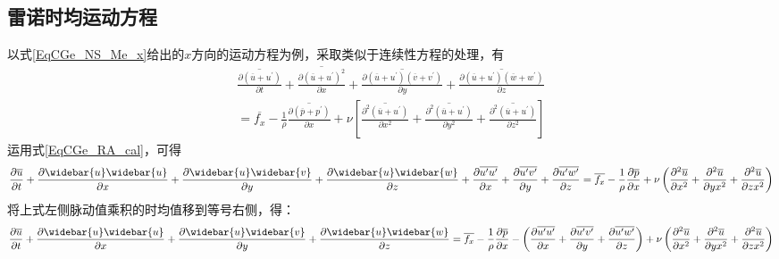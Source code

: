 \subsection{雷诺时均运动方程}
以式\eqref{EqCGe_NS_Me_x}给出的$x$方向的运动方程为例，采取类似于连续性方程的处理，有
\begin{equation*}
  \begin{aligned}
    \overline{
      \frac{\partial (\overline{u}+u^{\prime})}{\partial t}
    }
    +
    \overline{
      \frac{\partial (\overline{u}+u^{\prime})^{2}}{\partial x}
    }
    +
    \overline{
      \frac{\partial (\overline{u}+u^{\prime})(\overline{v}+v^{\prime})}{\partial y}
    }
    +
    \overline{
      \frac{\partial (\overline{u}+u^{\prime})(\overline{w}+w^{\prime})}{\partial z}
    }
    \\
    =
    \overline{f_{x}}
    -\frac{1}{\rho}
    \overline{
      \frac{\partial (\overline{p}+p^{\prime})}{\partial x}
    }
    +
    \nu
    \left[
      \overline{
        \frac{\partial^{2} (\overline{u}+u^{\prime})}{\partial x^{2}}
      }
      +
      \overline{
        \frac{\partial^{2} (\overline{u}+u^{\prime})}{\partial y^{2}}
      }
      +
      \overline{
        \frac{\partial^{2} (\overline{u}+u^{\prime})}{\partial z^{2}}
      }
    \right]
  \end{aligned}
\end{equation*}
运用式\eqref{EqCGe_RA_cal}，可得
\begin{equation*}
  \frac{\partial \overline{u}}{\partial t} +
  \frac{\partial \widebar{u}\widebar{u}}{\partial x} +
  \frac{\partial \widebar{u}\widebar{v}}{\partial y} +
  \frac{\partial \widebar{u}\widebar{w}}{\partial z} +
  \frac{\partial \overline{u^{\prime}u^{\prime}}}{\partial x} +
  \frac{\partial \overline{u^{\prime}v^{\prime}}}{\partial y} +
  \frac{\partial \overline{u^{\prime}w^{\prime}}}{\partial z}
  =
  \overline{f_{x}}
  -\frac{1}{\rho}\frac{\partial \overline{p}}{\partial x} +
  \nu
  \left(
  \frac{\partial^{2} \overline{u}}{\partial x^{2}} +
  \frac{\partial^{2} \overline{u}}{\partial y x^{2}} +
  \frac{\partial^{2} \overline{u}}{\partial z x^{2}}
  \right)
\end{equation*}
将上式左侧脉动值乘积的时均值移到等号右侧，得：
\begin{equation}
  \frac{\partial \overline{u}}{\partial t} +
  \frac{\partial \widebar{u}\widebar{u}}{\partial x} +
  \frac{\partial \widebar{u}\widebar{v}}{\partial y} +
  \frac{\partial \widebar{u}\widebar{w}}{\partial z}
  =
  \overline{f_{x}}
  -\frac{1}{\rho}\frac{\partial \overline{p}}{\partial x} -
  \left(
  \frac{\partial \overline{u^{\prime}u^{\prime}}}{\partial x} +
  \frac{\partial \overline{u^{\prime}v^{\prime}}}{\partial y} +
  \frac{\partial \overline{u^{\prime}w^{\prime}}}{\partial z}
  \right)
  +
  \nu
  \left(
  \frac{\partial^{2} \overline{u}}{\partial x^{2}} +
  \frac{\partial^{2} \overline{u}}{\partial y x^{2}} +
  \frac{\partial^{2} \overline{u}}{\partial z x^{2}}
  \right)
  \label{EqCGe_Ra_Me_temp1}
\end{equation}
